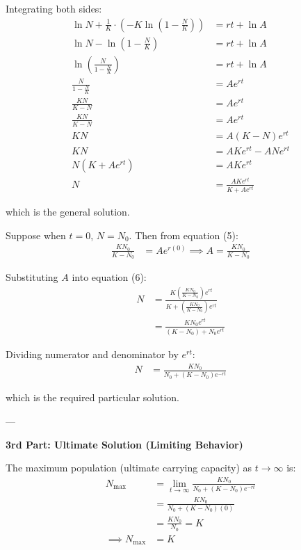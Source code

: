 Integrating both sides:
\begin{align*}
    \ln N + \frac{1}{K} \cdot \left(-K \ln\left(1 - \frac{N}{K}\right)\right) &= rt + \ln A \\
    \ln N - \ln\left(1 - \frac{N}{K}\right) &= rt + \ln A \\
    \ln\left(\frac{N}{1 - \frac{N}{K}}\right) &= rt + \ln A \\
    \frac{N}{1 - \frac{N}{K}} &= Ae^{rt} \\
    \frac{KN}{K - N} &= Ae^{rt}  \\
    \frac{KN}{K - N} &= A e^{rt} \tag{5}\\
    KN &= A(K - N) e^{rt} \\
    KN &= A K e^{rt} - A N e^{rt} \\
    N\left(K + A e^{rt}\right) &= A K e^{rt} \\
    N &= \frac{A K e^{rt}}{K + A e^{rt}} \tag{6}
\end{align*}

which is the general solution.

Suppose when $t = 0$, $N = N_0$. Then from equation (5):
\begin{align*}
    \frac{K N_0}{K - N_0} &= A e^{r(0)} \implies A = \frac{K N_0}{K - N_0}
\end{align*}

Substituting $A$ into equation (6):
\begin{align*}
    N &= \frac{K \left(\frac{K N_0}{K - N_0}\right) e^{rt}}{K + \left(\frac{K N_0}{K - N_0}\right) e^{rt}} \\
    &= \frac{K N_0 e^{rt}}{(K - N_0) + N_0 e^{rt}}
\end{align*}

Dividing numerator and denominator by $e^{rt}$:
\begin{align*}
    N &= \frac{K N_0}{N_0 + (K - N_0) e^{-rt}}
\end{align*}

which is the required particular solution.

---

\textbf{3rd Part: Ultimate Solution (Limiting Behavior)}

The maximum population (ultimate carrying capacity) as $t \to \infty$ is:
\begin{align*}
    N_{\max} &= \lim_{t \to \infty} \frac{K N_0}{N_0 + (K - N_0) e^{-rt}} \\
    &= \frac{K N_0}{N_0 + (K - N_0)(0)} \\
    &= \frac{K N_0}{N_0} = K \\
    \implies N_{\max} &= K
\end{align*}